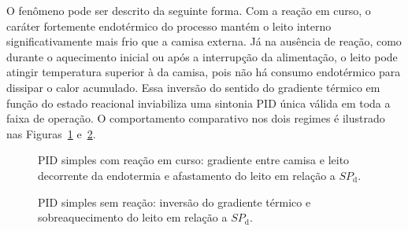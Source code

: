 O fenômeno pode ser descrito da seguinte forma. Com a reação em curso, o
caráter fortemente endotérmico do processo mantém o leito interno
significativamente mais frio que a camisa externa. Já na ausência de reação,
como durante o aquecimento inicial ou após a interrupção da alimentação,
o leito pode atingir temperatura superior à da camisa, pois não há consumo
endotérmico para dissipar o calor acumulado. Essa inversão do sentido do
gradiente térmico em função do estado reacional inviabiliza uma sintonia PID
única válida em toda a faixa de operação.\citep{luyben2014,essien2019}
O comportamento comparativo nos dois regimes é ilustrado nas
Figuras~\ref{fig:pid_com_reacao} e~\ref{fig:pid_sem_reacao}.

\begin{figure}[ht]
\begin{center}
\fbox{\parbox{7.5cm}{\centering\vspace{1.5cm}
{\small [FIGURA A INSERIR]\\[4pt]
PID simples, com reação em curso:\\temperaturas da camisa e do leito vs.\ tempo}\vspace{1.5cm}}}
\caption{PID simples com reação em curso: gradiente entre camisa e leito
decorrente da endotermia e afastamento do leito em relação a $SP_{\mathrm{d}}$.}
\label{fig:pid_com_reacao}
\end{center}
\end{figure}

\begin{figure}[ht]
\begin{center}
\fbox{\parbox{7.5cm}{\centering\vspace{1.5cm}
{\small [FIGURA A INSERIR]\\[4pt]
PID simples, sem reação (aquecimento a vazio):\\inversão do gradiente e sobreaquecimento}\vspace{1.5cm}}}
\caption{PID simples sem reação: inversão do gradiente térmico e sobreaquecimento
do leito em relação a $SP_{\mathrm{d}}$.}
\label{fig:pid_sem_reacao}
\end{center}
\end{figure}


